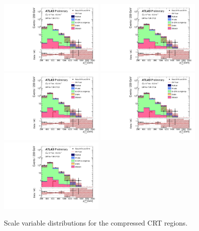 \begin{figure}[tbp]
\begin{center}
\includegraphics[width=0.45\textwidth]{figures/ATLAS-CONF-2016-078_INT/N-1Plots/AtlasStyle/Preliminary/CRT_SRJigsawSRC1_LastCut_CRT_minusone}
\includegraphics[width=0.45\textwidth]{figures/ATLAS-CONF-2016-078_INT/N-1Plots/AtlasStyle/Preliminary/CRT_SRJigsawSRC2_LastCut_CRT_minusone}
\includegraphics[width=0.45\textwidth]{figures/ATLAS-CONF-2016-078_INT/N-1Plots/AtlasStyle/Preliminary/CRT_SRJigsawSRC3_LastCut_CRT_minusone}
\includegraphics[width=0.45\textwidth]{figures/ATLAS-CONF-2016-078_INT/N-1Plots/AtlasStyle/Preliminary/CRT_SRJigsawSRC4_LastCut_CRT_minusone}
\includegraphics[width=0.45\textwidth]{figures/ATLAS-CONF-2016-078_INT/N-1Plots/AtlasStyle/Preliminary/CRT_SRJigsawSRC5_LastCut_CRT_minusone}
\end{center}
\caption{Scale variable distributions for the compressed CRT regions.}
\label{fig:CRT_SRJigsawSRC1_LastCut_CRT_minusone}
\end{figure}

